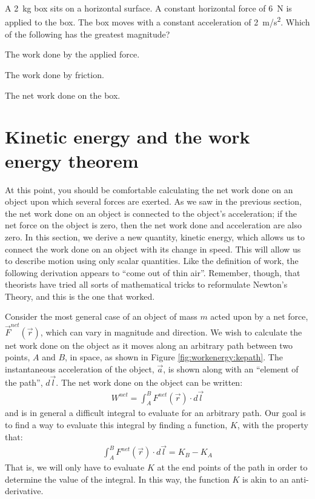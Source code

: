 \begin{checkpoint}
\begin{MCquestion}{A \SI{2}{kg} box sits on a horizontal surface. A constant horizontal force of \SI{6}{N} is applied to the box. The box moves with a constant acceleration of \SI{2}{m/s^2}. Which of the following has the greatest magnitude?}
\item The work done by the applied force. \correct
\item The work done by friction.
\item The net work done on the box.
\end{MCquestion}
\end{checkpoint}

\section{Kinetic energy and the work energy theorem}
\label{sec:workenergy:kinetic}
At this point, you should be comfortable calculating the net work done on an object upon which several forces are exerted. As we saw in the previous section, the net work done on an object is connected to the object's acceleration; if the net force on the object is zero, then the net work done and acceleration are also zero. In this section, we derive a new quantity, kinetic energy, which allows us to connect the work done on an object with its change in speed. This will allow us to describe motion using only scalar quantities. Like the definition of work, the following derivation appears to ``come out of thin air''. Remember, though, that theorists have tried all sorts of mathematical tricks to reformulate Newton's Theory, and this is the one that worked.

Consider the most general case of an object of mass $m$ acted upon by a net force, $\vec F^{net}(\vec r)$, which can vary in magnitude and direction. We wish to calculate the  net work done on the object as it moves along an arbitrary path between two points, $A$ and $B$, in space, as shown in Figure \ref{fig:workenergy:kepath}. The instantaneous acceleration of the object, $\vec a$, is shown along with an ``element of the path'', $d\vec l$. 
The net work done on the object can be written:
\begin{align*}
W^{net} = \int_A^B F^{net}(\vec r) \cdot d\vec l
\end{align*} 
and is in general a difficult integral to evaluate for an arbitrary path. Our goal is to find a way to evaluate this integral by finding a function, $K$, with the property that:
\begin{align*}
\int_A^B F^{net}(\vec r) \cdot d\vec l =K_B - K_A
\end{align*}
That is, we will only have to evaluate $K$ at the end points of the path in order to determine the value of the integral. In this way, the function $K$ is akin to an anti-derivative.  

